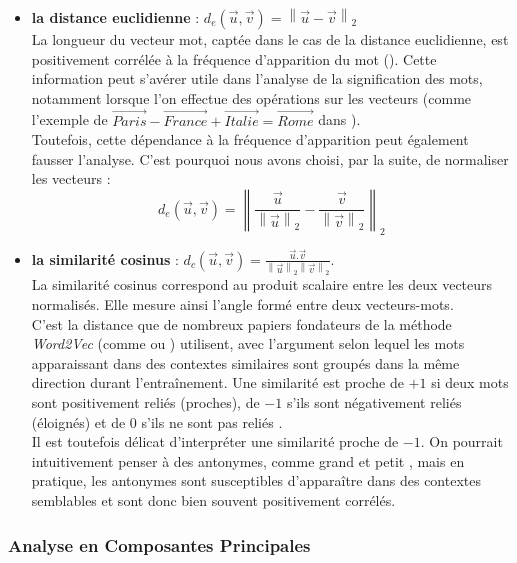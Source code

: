 \documentclass[11pt,french,french]{article}
\providecommand{\tightlist}{%
  \setlength{\parskip}{0pt}
  }
\begin{document}
\begin{itemize}
\tightlist
\item
  \textbf{la distance euclidienne} :
  \(d_{e}(\vec{u},\vec{v}) = \left\| \vec{u} - \vec{v} \right\|_2\)\\
  La longueur du vecteur mot, captée dans le cas de la distance
  euclidienne, est positivement corrélée à la fréquence d'apparition du
  mot (\cite{Schakel}). Cette information peut s'avérer utile dans
  l'analyse de la signification des mots, notamment lorsque l'on
  effectue des opérations sur les vecteurs (comme l'exemple de
  \(\overrightarrow{Paris} - \overrightarrow{France} + \overrightarrow{Italie} = \overrightarrow{Rome}\)
  dans \cite{Mikolov}).\\
  Toutefois, cette dépendance à la fréquence d'apparition peut également
  fausser l'analyse. C'est pourquoi nous avons choisi, par la suite, de
  normaliser les vecteurs :
  \[ d_{e}(\vec{u},\vec{v}) = \left\| \frac{\vec{u}}{\left\| \vec{u} \right\|_2} - \frac{\vec{v}}{\left\| \vec{v} \right\|_2}  \right\|_2\]
\item
  \textbf{la similarité cosinus} :
  \(d_{c}(\vec{u}, \vec{v}) = \frac{\vec{u}.\vec{v}}{\left\| \vec{u} \right\|_2 \left\| \vec{v} \right\|_2 }\).\\
  La similarité cosinus correspond au produit scalaire entre les deux
  vecteurs normalisés. Elle mesure ainsi l'angle formé entre deux
  vecteurs-mots.\\
  C'est la distance que de nombreux papiers fondateurs de la méthode
  \emph{Word2Vec} (comme \cite{Mikolov} ou \cite{Levy}) utilisent, avec
  l'argument selon lequel les mots apparaissant dans des contextes
  similaires sont groupés dans la même direction durant l'entraînement.
  Une similarité est proche de \(+1\) si deux mots sont positivement
  reliés (proches), de \(-1\) s'ils sont négativement reliés (éloignés)
  et de 0 s'ils ne sont pas \og reliés \fg{}.\\
  Il est toutefois délicat d'interpréter une similarité proche de
  \(-1\). On pourrait intuitivement penser à des antonymes, comme
  \og grand \fg{} et \og petit \fg{}, mais en pratique, les antonymes
  sont susceptibles d'apparaître dans des contextes semblables et sont
  donc bien souvent positivement corrélés.
\end{itemize}

\subsubsection{Analyse en Composantes
Principales}\label{analyse-en-composantes-principales}
\end{document}
